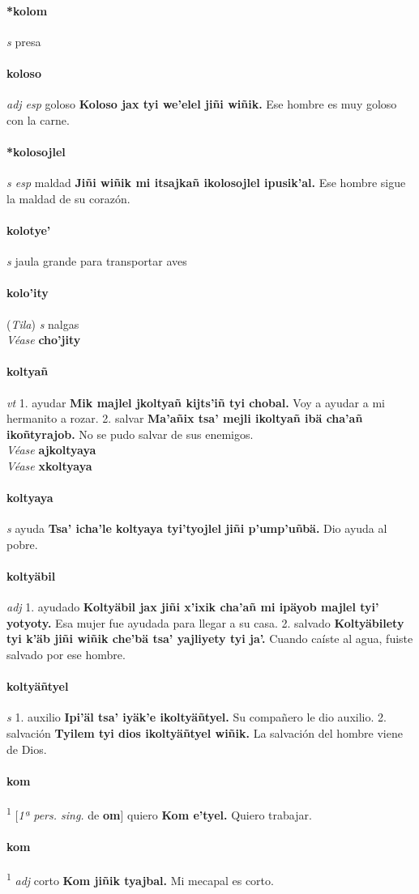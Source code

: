 \documentclass{scrbook}
\newcommand{\entry}[1]{\paragraph{#1}}
\newcommand{\onedefinition}[1]{#1.}
\newcommand{\defsuperscript}[1]{\textsuperscript{1}}
\newcommand{\partofspeech}[1]{\textit{#1}}
\newcommand{\spanishtranslation}[1]{#1}
\newcommand{\cholexample}[1]{\textbf{#1}}
\newcommand{\exampletranslation}[1]{#1}
\newcommand{\alsosee}[1]{\\\textit{Véase} \textbf{#1}}
\newcommand{\relevantdialect}[1]{(\textit{#1})}
\newcommand{\conjugationtense}[1]{[\textit{#1}}
\newcommand{\conjugationverb}[1]{de \textbf{#1}]}
\begin{document}
\begin{multicols}{2}
\entry{*kolom}
\partofspeech{s}
\spanishtranslation{presa}

\entry{koloso}
\partofspeech{adj esp}
\spanishtranslation{goloso}
\cholexample{Koloso jax tyi we'elel jiñi wiñik.}
\exampletranslation{Ese hombre es muy goloso con la carne.}

\entry{*kolosojlel}
\partofspeech{s esp}
\spanishtranslation{maldad}
\cholexample{Jiñi wiñik mi itsajkañ ikolosojlel ipusik'al.}
\exampletranslation{Ese hombre sigue la maldad de su corazón.}

\entry{kolotye'}
\partofspeech{s}
\spanishtranslation{jaula grande para transportar aves}

\entry{kolo'ity}
\relevantdialect{Tila}
\partofspeech{s}
\spanishtranslation{nalgas}
\alsosee{cho'jity}

\entry{koltyañ}
\partofspeech{vt}
\onedefinition{1}
\spanishtranslation{ayudar}
\cholexample{Mik majlel jkoltyañ kijts'iñ tyi chobal.}
\exampletranslation{Voy a ayudar a mi hermanito a rozar.}
\onedefinition{2}
\spanishtranslation{salvar}
\cholexample{Ma'añix tsa' mejli ikoltyañ ibä cha'añ ikoñtyrajob.}
\exampletranslation{No se pudo salvar de sus enemigos.}
\alsosee{ajkoltyaya}
\alsosee{xkoltyaya}

\entry{koltyaya}
\partofspeech{s}
\spanishtranslation{ayuda}
\cholexample{Tsa' icha'le koltyaya tyi'tyojlel jiñi p'ump'uñbä.}
\exampletranslation{Dio ayuda al pobre.}

\entry{koltyäbil}
\partofspeech{adj}
\onedefinition{1}
\spanishtranslation{ayudado}
\cholexample{Koltyäbil jax jiñi x'ixik cha'añ mi ipäyob majlel tyi' yotyoty.}
\exampletranslation{Esa mujer fue ayudada para llegar a su casa.}
\onedefinition{2}
\spanishtranslation{salvado}
\cholexample{Koltyäbilety tyi k'äb jiñi wiñik che'bä tsa' yajliyety tyi ja'.}
\exampletranslation{Cuando caíste al agua, fuiste salvado por ese hombre.}

\entry{koltyäñtyel}
\partofspeech{s}
\onedefinition{1}
\spanishtranslation{auxilio}
\cholexample{Ipi'äl tsa' iyäk'e ikoltyäñtyel.}
\exampletranslation{Su compañero le dio auxilio.}
\onedefinition{2}
\spanishtranslation{salvación}
\cholexample{Tyilem tyi dios ikoltyäñtyel wiñik.}
\exampletranslation{La salvación del hombre viene de Dios.}

\entry{kom}
\defsuperscript{1}
\conjugationtense{1ª pers. sing.}
\conjugationverb{om}
\spanishtranslation{quiero}
\cholexample{Kom e'tyel.}
\exampletranslation{Quiero trabajar.}

\entry{kom}
\defsuperscript{2}
\partofspeech{adj}
\spanishtranslation{corto}
\cholexample{Kom jiñik tyajbal.}
\exampletranslation{Mi mecapal es corto.}


\end{multicols}
\end{document}
